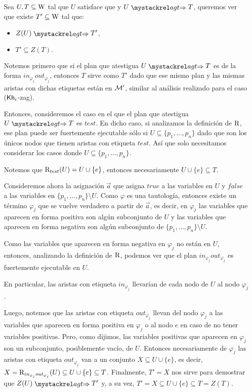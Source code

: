 \begin{demostracion}
\begin{itemize}
    Sea $U, T \subseteq \mathrm{W}$ tal que $U$ satisface que  y $U \ultsExecAgagt T$, queremos ver que existe 
    $T' \subseteq \mathrm{W}$ tal que:

    \begin{multicols}{2}
        \begin{itemize}
            \item $Z(U) \ultsExecAgagt T'$, 
            \item $T' \subseteq Z(T)$.
        \end{itemize}
    \end{multicols}

    Notemos primero que si el plan que atestigua $U \ultsExecAgagt T$ es de la forma $in_{\varphi_j}out_{\varphi_j}$, 
    entonces $T$ sirve como $T'$ dado que ese mismo plan y las mismas aristas con dichas etiquetas están en $\mathcal{M}'$, 
    similar al análisis realizado para el caso ($\mathsf{Kh}_i$-zag).

    Entonces, consideremos el caso en el que el plan que atestigua $U \ultsExecAgagt T$ es $test$. En dicho caso, 
    si analizamos la definición de $\mathrm{R}$, ese plan puede ser fuertemente ejecutable sólo si $U \subseteq \{p_1,...,p_n\}$ 
    dado que son los únicos nodos que tienen aristas con etiqueta $test$. Así que solo necesitamos considerar los casos 
    donde $U \subseteq \{p_1,...,p_n\}$.

    Notemos que $\mathrm{R}_{test}(U) = U \cup \{e\}$, entonces necesariamente $U \cup \{e\} \subseteq T$.

    Consideremos ahora la asignación $\overrightarrow{a}$ que asigna $true$ a las variables en $U$ y $false$ a las variables 
    en $\{p_1,...,p_n\} \setminus U$. Como $\varphi$ es una tautología, entonces existe un término $\varphi_j$ que se vuelve verdadero a partir 
    de $\overrightarrow{a}$, es decir, en $\varphi_j$ las variables que aparecen en forma positiva son algún subconjunto de 
    $U$ y las variables que aparecen en forma negativa son algún subconjunto de $\{p_1,...,p_n\} \setminus U$.

    Como las variables que aparecen en forma negativa en $\varphi_j$ no están en $U$, entonces, analizando la definición de $\mathrm{R}$, 
    podemos ver que el plan $in_{\varphi_j}out_{\varphi_j}$ es fuertemente ejecutable en $U$. 
    
    En particular, las aristas con etiqueta $in_{\varphi_j}$ llevarían de cada nodo de $U$ al nodo $\varphi_j$.

    Luego, notemos que las aristas con etiqueta $out_{\varphi_j}$ llevan del nodo $\varphi_j$ a las variables 
    que aparecen en forma positiva en $\varphi_j$ o al nodo $e$ en caso de no tener variables positivas. Pero, como dijimos, 
    las variables positivas que aparecen en $\varphi_j$ son un subconjunto, posiblemente vacío, de $U$.
    Entonces necesariamente de $\varphi_j$ las aristas con etiqueta $out_{\varphi_j}$ van a un conjunto $X \subseteq U \cup \{e\}$, 
    es decir, $X = \mathrm{R}_{in_{\varphi_j}out_{\varphi_j}}(U) \subseteq U \cup \{e\} \subseteq T$. 
    Finalmente, $T' = X$ nos sirve para demostrar que $Z(U) \ultsExecAgagt T'$ y, a su vez, 
    $T' = X \subseteq U \cup \{e\} \subseteq T = Z(T)$.


\end{itemize}
\end{demostracion}
